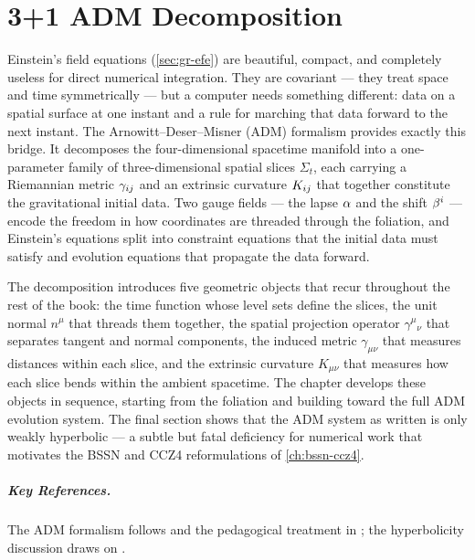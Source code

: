 \chapter{3+1 ADM Decomposition}
\label{ch:adm-decomposition}

Einstein's field equations (\cref{sec:gr-efe}) are beautiful, compact, and
completely useless for direct numerical integration.  They are covariant ---
they treat space and time symmetrically --- but a computer needs something
different: data on a spatial surface at one instant and a rule for marching
that data forward to the next instant.  The Arnowitt--Deser--Misner (ADM)
formalism provides exactly this bridge.  It decomposes the four-dimensional
spacetime manifold into a one-parameter family of three-dimensional spatial
slices $\Sigma_t$, each carrying a Riemannian metric $\gamma_{ij}$ and
an extrinsic curvature $K_{ij}$ that together constitute the
gravitational initial data.  Two gauge fields --- the lapse $\alpha$ and
the shift $\beta^{i}$ --- encode the freedom in how coordinates are threaded
through the foliation, and Einstein's equations split into constraint
equations that the initial data must satisfy and evolution equations that
propagate the data forward.

The decomposition introduces five geometric objects that recur throughout
the rest of the book: the time function whose level sets define the slices,
the unit normal $n^\mu$ that threads them together, the spatial projection
operator $\gamma^\mu{}_\nu$ that separates tangent and normal components,
the induced metric $\gamma_{\mu\nu}$ that measures distances within each
slice, and the extrinsic curvature $K_{\mu\nu}$ that measures how each
slice bends within the ambient spacetime.  The chapter develops these
objects in sequence, starting from the foliation and building toward the
full ADM evolution system.  The final section shows that the ADM system as
written is only weakly hyperbolic --- a subtle but fatal deficiency for
numerical work that motivates the BSSN and CCZ4 reformulations of
\cref{ch:bssn-ccz4}.









\paragraph{Key References.}
The ADM formalism follows \cite{ADM1962} and the pedagogical treatment in
\cite{Baumgarte2010}; the hyperbolicity discussion draws on
\cite{Alcubierre2008}.
